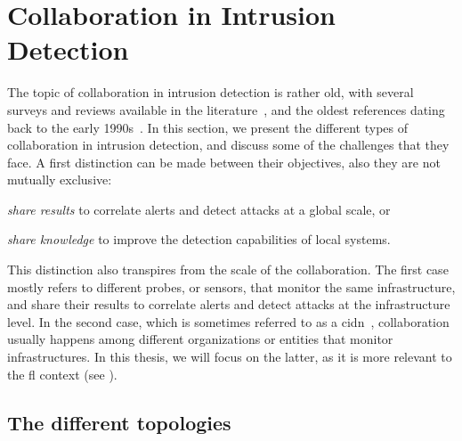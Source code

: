 \section{Collaboration in Intrusion Detection\label{sec:bg.collab}}

The topic of collaboration in intrusion detection is rather old, with several surveys and reviews available in the literature~\cite{zhou_surveycoordinatedattacks_2010,elshoush_Alertcorrelationcollaborative_2011,vasilomanolakis_TaxonomySurveyCollaborative_2015,meng_CollaborativeSecuritySurvey_2015,folino_Ensemblebasedcollaborative_2016,li_SurveyingTrustBasedCollaborative_2022}, and the oldest references dating back to the early 1990s~\cite{snapp_DIDSdistributedintrusion_1992}.
In this section, we present the different types of collaboration in intrusion detection, and discuss some of the challenges that they face.
A first distinction can be made between their objectives, also they are not mutually exclusive:
\begin{enumerate*}[(i)]
  \item \emph{share results} to correlate alerts and detect attacks at a global scale, or
  \item \emph{share knowledge} to improve the detection capabilities of local systems.
\end{enumerate*}

This distinction also transpires from the scale of the collaboration.
The first case mostly refers to different probes, or sensors, that monitor the same infrastructure, and share their results to correlate alerts and detect attacks at the infrastructure level.
In the second case, which is sometimes referred to as a \gls{cidn}~\cite{li_SurveyingTrustBasedCollaborative_2022}, collaboration usually happens among different organizations or entities that monitor infrastructures.
In this thesis, we will focus on the latter, as it is more relevant to the \gls{fl} context (see ).


\subsection{The different topologies\label{sec:bg.collab.topo}}

